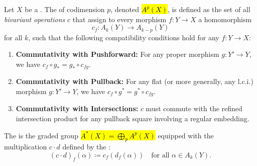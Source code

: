 \begin{definition} \label{definition:operational_chow_ring_of_a_noetherian_scheme}
Let $X$ be a . 
The  of codimension $p$, denoted \hl{$A^p(X)$}, is defined as the set of all \textit{bivariant operations} $c$ that assign to every morphism $f: Y \to X$ a homomorphism 
\[ c_f : A_k(Y) \to A_{k-p}(Y) \]
for all $k$, such that the following compatibility conditions hold for any $f: Y \to X$:
\begin{enumerate}
    \item \textbf{Commutativity with Pushforward:} For any proper morphism $g: Y' \to Y$, we have $c_f \circ g_* = g_* \circ c_{fg}$.
    \item \textbf{Commutativity with Pullback:} For any flat (or more generally, any l.c.i.) morphism $g: Y' \to Y$, we have $c_f \circ g^* = g^* \circ c_{fg}$.
    \item \textbf{Commutativity with Intersections:} $c$ must commute with the refined intersection product for any pullback square involving a regular embedding.
\end{enumerate}
The  is the graded group \hl{$A^*(X) = \bigoplus_p A^p(X)$} equipped with the multiplication $c \cdot d$ defined by the :
\[ (c \cdot d)_f(\alpha) \coloneqq c_f(d_f(\alpha)) \quad \text{for all } \alpha \in A_k(Y). \]
\end{definition}